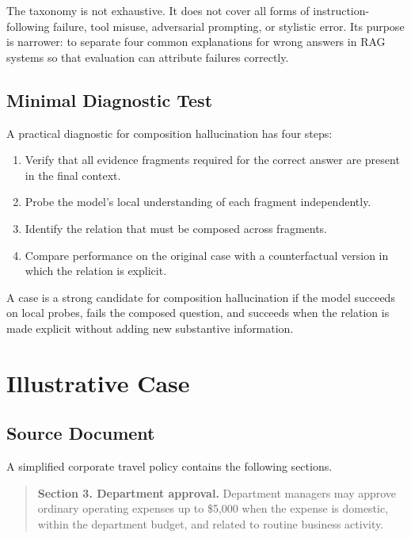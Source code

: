 \documentclass[11pt]{article}
\begin{document}
The taxonomy is not exhaustive. It does not cover all forms of instruction-following failure, tool misuse, adversarial prompting, or stylistic error. Its purpose is narrower: to separate four common explanations for wrong answers in RAG systems so that evaluation can attribute failures correctly.

\subsection{Minimal Diagnostic Test}

A practical diagnostic for composition hallucination has four steps:

\begin{enumerate}[leftmargin=*,itemsep=2pt]
    \item Verify that all evidence fragments required for the correct answer are present in the final context.
    \item Probe the model's local understanding of each fragment independently.
    \item Identify the relation that must be composed across fragments.
    \item Compare performance on the original case with a counterfactual version in which the relation is explicit.
\end{enumerate}

A case is a strong candidate for composition hallucination if the model succeeds on local probes, fails the composed question, and succeeds when the relation is made explicit without adding new substantive information.

\section{Illustrative Case}

\subsection{Source Document}

A simplified corporate travel policy contains the following sections.

\begin{quote}
\textbf{Section 3. Department approval.} Department managers may approve ordinary operating expenses up to \$5,000 when the expense is domestic, within the department budget, and related to routine business activity.
\end{quote}
\end{document}
